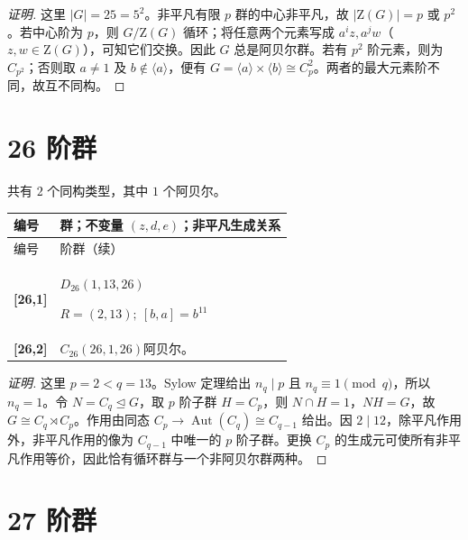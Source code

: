 \documentclass[UTF8,fontset=fandol,11pt,a4paper]{ctexart}
\newcommand{\Aut}{\operatorname{Aut}}\newcommand{\GL}{\operatorname{GL}}\newcommand{\ord}{\operatorname{ord}}\newcommand{\Z}{\mathrm Z}
\begin{document}
\begin{proof}[证明]
这里 $|G|=25=5^2$。非平凡有限 $p$ 群的中心非平凡，故 $|\Z(G)|=p$ 或 $p^2$。若中心阶为 $p$，则 $G/\Z(G)$ 循环；将任意两个元素写成 $a^iz,a^jw$（$z,w\in\Z(G)$），可知它们交换。因此 $G$ 总是阿贝尔群。若有 $p^2$ 阶元素，则为 $C_{p^2}$；否则取 $a\ne1$ 及 $b\notin\langle a\rangle$，便有 $G=\langle a\rangle\times\langle b\rangle\cong C_p^2$。两者的最大元素阶不同，故互不同构。
\end{proof}

\section*{26 阶群}\label{order:26}

共有 $2$ 个同构类型，其中 $1$ 个阿贝尔。

\begingroup\small\setlength{\tabcolsep}{3pt}\renewcommand{\arraystretch}{1.12}

\begin{longtable}{@{}p{17mm}>{\raggedright\arraybackslash}p{141mm}@{}}

\toprule 编号 & 群；不变量 $(z,d,e)$；非平凡生成关系\\\midrule\endfirsthead

\toprule 编号 & 26 阶群（续）\\\midrule\endhead\bottomrule\endfoot

\textbf{[26,1]} & $D_{26}$\quad $(1,13,26)$\par\(R=(2,13);\allowbreak\ [b,a]=b^{11}\)\\[3pt]

\textbf{[26,2]} & $C_{26}$\quad $(26,1,26)$\quad 阿贝尔。\\[3pt]

\end{longtable}\endgroup

\begin{proof}[证明]
这里 $p=2<q=13$。Sylow 定理给出 $n_q\mid p$ 且 $n_q\equiv1\pmod q$，所以 $n_q=1$。令 $N=C_q\trianglelefteq G$，取 $p$ 阶子群 $H=C_p$，则 $N\cap H=1$，$NH=G$，故 $G\cong C_q\rtimes C_p$。作用由同态 $C_p\to\Aut(C_q)\cong C_{q-1}$ 给出。因 $2\mid 12$，除平凡作用外，非平凡作用的像为 $C_{q-1}$ 中唯一的 $p$ 阶子群。更换 $C_p$ 的生成元可使所有非平凡作用等价，因此恰有循环群与一个非阿贝尔群两种。
\end{proof}

\section*{27 阶群}\label{order:27}
\end{document}
